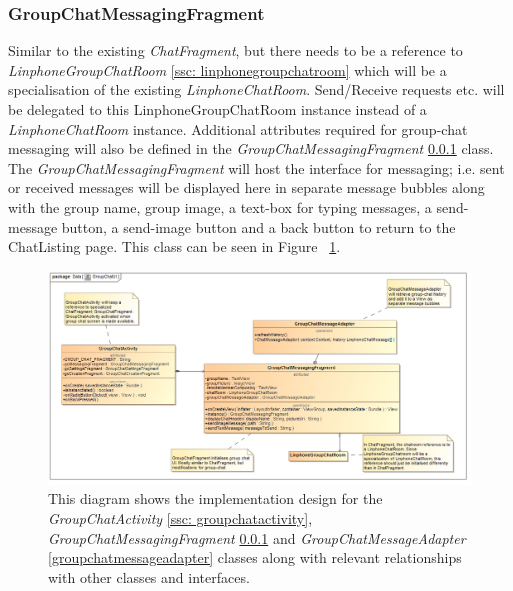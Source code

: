 \documentclass[11pt]{article}
\begin{document}
\subsubsection{GroupChatMessagingFragment}\label{groupchatmessagingfragment}
Similar to the existing \textit{ChatFragment}, but there needs to be a reference to \textit{LinphoneGroupChatRoom} \ref{ssc: linphonegroupchatroom} which will be a specialisation of the existing \textit{LinphoneChatRoom}. Send/Receive requests etc. will be delegated to this LinphoneGroupChatRoom instance instead of a \textit{LinphoneChatRoom} instance. Additional attributes required for group-chat messaging will also be defined in the \textit{GroupChatMessagingFragment} \ref{groupchatmessagingfragment} class. 
The \textit{GroupChatMessagingFragment} will host the interface for messaging; i.e. sent or received messages will be displayed here in separate message bubbles along with the group name, group image, a text-box for typing messages, a send-message button, a send-image button and a back button to return to the ChatListing page.
This class can be seen in Figure ~\ref{cd-group-chat-messaging-ui}.
\begin{figure}[H]
\centering
\centerline{\includegraphics[width=7in]{./images/class_group_chat_messaging_ui.png}}
\caption[Android Group Chat Messaging UI Class Diagram]{This diagram shows the implementation design for the \textit{GroupChatActivity} \ref{ssc: groupchatactivity}, \textit{GroupChatMessagingFragment} \ref{groupchatmessagingfragment} and \textit{GroupChatMessageAdapter} \ref{groupchatmessageadapter} classes along with relevant relationships with other classes and interfaces.}
\label{cd-group-chat-messaging-ui}
\end{figure}
\end{document}
